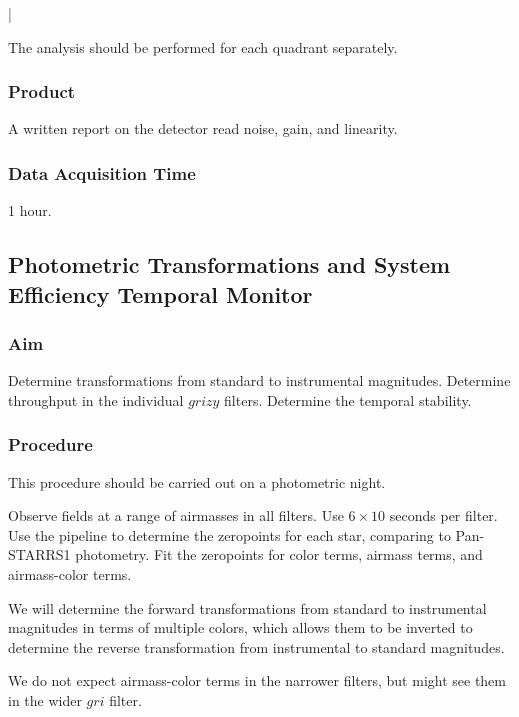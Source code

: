 |\documentclass{article}
\begin{document}
The analysis should be performed for each quadrant separately.

\subsubsection{Product}

A written report on the detector read noise, gain, and linearity.

\subsubsection{Data Acquisition Time}

1 hour.


\subsection{Photometric Transformations and System Efficiency Temporal Monitor}

\subsubsection{Aim}

Determine transformations from standard to instrumental magnitudes. Determine throughput in the individual $grizy$ filters. Determine the temporal stability.

\subsubsection{Procedure}

This procedure should be carried out on a photometric night.

Observe fields at a range of airmasses in all filters. Use $6 \times 10$ seconds per filter. Use the pipeline to determine the zeropoints for each star, comparing to Pan-STARRS1 photometry. Fit the zeropoints for color terms, airmass terms, and airmass-color terms.

We will determine the forward transformations from standard to instrumental magnitudes in terms of multiple colors, which allows them to be inverted to determine the reverse transformation from instrumental to standard magnitudes.

We do not expect airmass-color terms in the narrower filters, but might see them in the wider $gri$ filter.
\end{document}
